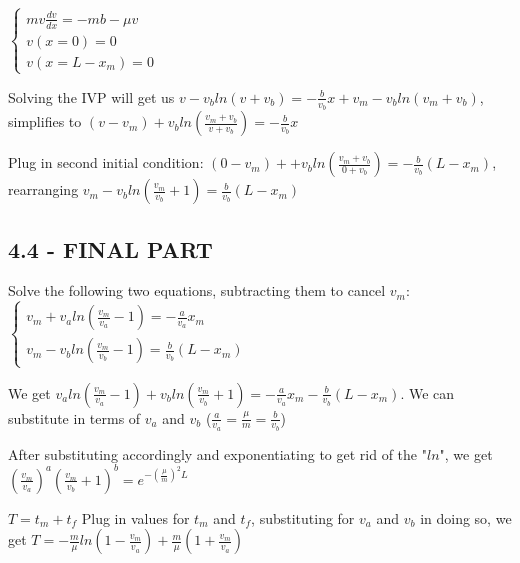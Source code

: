\documentclass{article}
\begin{document}
$\begin{cases}
    mv\frac{dv}{dx} = -mb - \mu v \\
    v(x = 0) = 0 \\
    v(x = L - x_{m}) = 0
    \end{cases}$ \par\vspace{0.25cm}
    
\noindent Solving the IVP will get us $v - v_{b}ln(v + v_{b}) = -\frac{b}{v_{b}}x + v_{m} - v_{b}ln(v_{m} + v_{b})$, simplifies to $(v - v_{m}) + v_{b}ln(\frac{v_{m} + v_{b}}{v + v_{b}}) = -\frac{b}{v_{b}}x$ \par
\noindent Plug in second initial condition: $(0 - v_{m}) + + v_{b}ln(\frac{v_{m} + v_{b}}{0 + v_{b}}) = -\frac{b}{v_{b}}(L - x_{m})$, rearranging $v_{m} - v_{b}ln(\frac{v_{m}}{v_{b}} + 1) = \frac{b}{v_{b}}(L - x_{m})$ \par\vspace{0.25cm}
\subsection{4.4 - FINAL PART}
\noindent Solve the following two equations, subtracting them to cancel $v_{m}$:
$\begin{cases}
    v_{m} + v_{a}ln(\frac{v_{m}}{v_{a}} - 1) = -\frac{a}{v_{a}}x_{m}\\
    v_{m} - v_{b}ln(\frac{v_{m}}{v_{b}} - 1) = \frac{b}{v_{b}}(L - x_{m})
    \end{cases}$ \par\vspace{0.25cm}
    
\noindent We get $v_{a}ln(\frac{v_{m}}{v_{a}} - 1) + v_{b}ln(\frac{v_{m}}{v_{b}} + 1) = -\frac{a}{v_{a}}x_{m} - \frac{b}{v_{b}}(L - x_{m})$.  We can substitute in terms of $v_{a}$ and $v_{b}$ ($\frac{a}{v_{a}} = \frac{\mu}{m} = \frac{b}{v_{b}}$) \par\vspace{0.25cm}

\noindent After substituting accordingly and exponentiating to get rid of the "$ln$", we get $(\frac{v_{m}}{v_{a}})^{a}(\frac{v_{m}}{v_{b}} + 1)^{b} = e^{-(\frac{\mu}{m})^{2}L}$ \par\vspace{0.25cm}

\noindent $T = t_{m} + t_{f}$  Plug in values for $t_{m}$ and $t_{f}$, substituting for $v_{a}$ and $v_{b}$ in doing so, we get $T = -\frac{m}{\mu}ln(1 - \frac{v_{m}}{v_{a}}) + \frac{m}{\mu}(1 + \frac{v_{m}}{v_{a}})$
\end{document}
